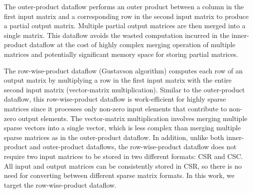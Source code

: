 The outer-product dataflow performs an outer product between a column in the
first input matrix and a corresponding row in the second input matrix to
produce a partial output matrix.
Multiple partial output matrices are then merged into a single matrix.
This dataflow avoids the wasted computation incurred in the inner-product
dataflow at the cost of highly complex merging operation of multiple matrices
and potentially significant memory space for storing partial matrices.

The row-wise-product dataflow (Gustavson algorithm) computes each row
of an output matrix by multiplying a row in the first input matrix with the
entire second input matrix (vector-matrix multiplication).
Similar to the outer-product dataflow, this row-wise-product dataflow is
work-efficient for highly sparse matrices since it processes only non-zero
input elements that contribute to non-zero output elements.
The vector-matrix multiplication involves merging multiple sparse vectors into
a single vector, which is less complex than merging multiple sparse matrices as
in the outer-product dataflow.
In addition, unlike both inner-product and outer-product dataflows, the
row-wise-product dataflow does not require two input matrices to be stored in
two different formats: CSR and CSC.
All input and output matrices can be consistently stored in CSR, so there is no
need for converting between different sparse matrix formats.
In this work, we target the row-wise-product dataflow.
